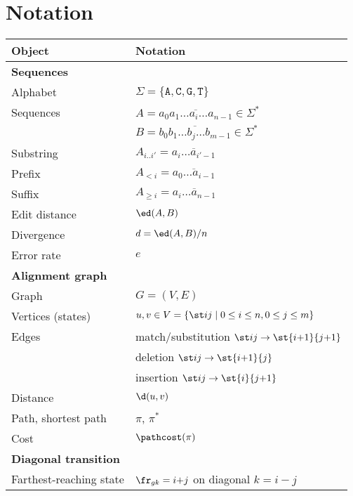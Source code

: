 \newcommand*{\tabindent}{\hspace{2mm}}

\section{Notation}\label{sec:notation}

\begin{tabular}[t]{ll}
  \toprule
  \textbf{Object}	         & \textbf{Notation}\\
  \midrule
  \textbf{Sequences}  & \\
  \tabindent Alphabet            	&
									$\Sigma = \{\mathtt A,\mathtt C,\mathtt G,\mathtt T\}$ \\
  \tabindent Sequences            &
									$A = \overline{a_0a_1 \dots a_i \dots a_{n-1}}\in \Sigma^*$\\
							 & $B = \overline{b_0b_1 \dots b_j \dots b_{m-1}} \in \Sigma^*$ \\
  \tabindent Substring          & $A_{i..i'} = \overline{a_i \dots a_{i'-1}}$ \\
  \tabindent Prefix & $A_{< i} = \overline{a_0 \dots a_{i-1}}$ \\
  \tabindent Suffix & $A_{\geq i} = \overline{a_i \dots a_{n-1}}$ \\
  \tabindent Edit distance        & $\ed(A,B)$\\
  \tabindent Divergence        & $d = \ed(A,B) / n$\\
  \tabindent Error rate        & $e$\\
  \midrule
  \textbf{Alignment graph} & \\
  \tabindent Graph& $G=(V,E)$\\
  \tabindent Vertices (states) & $u,v \in V=\{\st ij \mid 0\leq i\leq n, 0\leq j
								 \leq m\}$\\
  \tabindent Edges& match/substitution $\st ij \to \st {i{+}1}{j{+}1}$\\
							 & deletion $\st ij \to \st {i{+}1}{j}$\\
							 & insertion $\st ij \to \st {i}{j{+}1}$\\
  \tabindent Distance & $\d(u, v)$\\
  \tabindent Path, shortest path & $\pi$, $\pi^*$\\
  \tabindent Cost & $\pathcost(\pi)$\\
  \midrule
  \textbf{Diagonal transition} & \\
  \tabindent Farthest-reaching state & $\fr_{gk} = i{+}j$ on diagonal $k{=}i{-}j$ \\

\end{tabular}
